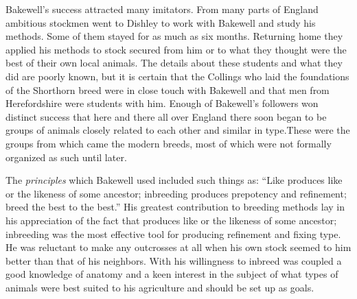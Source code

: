 Bakewell's success attracted many imitators. From many parts of England ambitious stockmen went to Dishley to work with 
Bakewell and study his methods. Some of them stayed for as much as six months. Returning home they applied his methods to 
stock secured from him or to what they thought were the best of their own local animals. The details about these students 
and what they did are poorly known, but it is certain that the Collings who laid the foundations of the Shorthorn breed 
were in close touch with Bakewell and that men from Herefordshire were students with him. Enough of Bakewell's followers 
won distinct success that here and there all over England there soon began to be groups of animals closely related to each 
other and similar in type.These were the groups from which came the modern breeds, most of which were not formally 
organized as such until later. 

The \textit{principles} which Bakewell used included such things as: ``Like produces like or the likeness of some ancestor; 
inbreeding produces prepotency and refinement; breed the best to the best.'' His greatest contribution to breeding methods 
lay in his appreciation of the fact that produces like or the likeness of some ancestor; 
inbreeding was the most effective tool for producing refinement and fixing type. 
He was reluctant to make any outcrosses at all when his own stock seemed to him better than that of his neighbors. With his 
willingness to inbreed was coupled a good knowledge of anatomy and a keen interest in the subject of what types of animals 
were best suited to his agriculture and should be set up as goals. 

